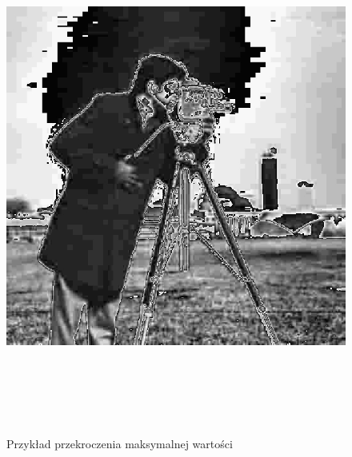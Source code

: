 \documentclass[a4paper,12pt]{book}
\begin{document}
\begin{figure}[H]
	\caption{Przykład przekroczenia maksymalnej wartości}
	\includegraphics[width=17cm, height=17cm]{2-2/multiply-gray-const-error.png}
\end{figure}
\end{document}

